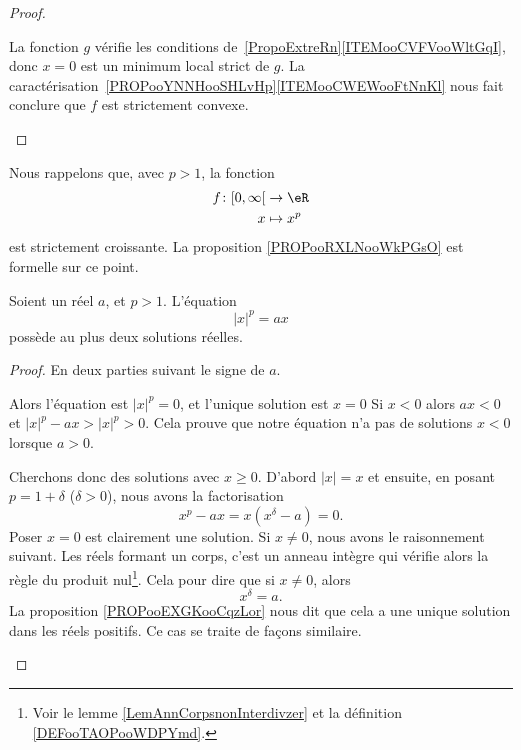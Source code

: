 \begin{proof}
\begin{subproof}
		\spitem[\ref{ITEMooDGISooPlRLOd}]

		La fonction \( g\) vérifie les conditions de~\ref{PropoExtreRn}\ref{ITEMooCVFVooWltGqI}, donc \( x=0\) est un minimum local strict de \( g\). La caractérisation~\ref{PROPooYNNHooSHLvHp}\ref{ITEMooCWEWooFtNnKl} nous fait conclure que \( f\) est strictement convexe.

	\end{subproof}
\end{proof}

\begin{normaltext}
	Nous rappelons que, avec \( p>1\), la fonction
	\begin{equation}
		\begin{aligned}
			f\colon \mathopen[ 0 , \infty \mathclose[ & \to \eR     \\
			x                                         & \mapsto x^p
		\end{aligned}
	\end{equation}
	est strictement croissante. La proposition \ref{PROPooRXLNooWkPGsO} est formelle sur ce point.
\end{normaltext}

\begin{lemma}
	Soient un réel \( a\), et \( p>1\). L'équation
	\begin{equation}
		| x |^p=ax
	\end{equation}
	possède au plus deux solutions réelles.
\end{lemma}

\begin{proof}
	En deux parties suivant le signe de \( a\).
	\begin{subproof}
		\spitem[Si \( a=0\)]
		Alors l'équation est \( | x |^p=0\), et l'unique solution est \( x=0\)
		\spitem[Si \( a>0\)]
		Si \( x<0\) alors \( ax<0\) et \( | x |^p-ax>| x |^p>0\). Cela prouve que notre équation n'a pas de solutions \( x<0\) lorsque \( a>0\).

		Cherchons donc des solutions avec \( x\geq 0\). D'abord \( | x |=x\) et ensuite, en posant \( p=1+\delta\) (\( \delta>0\)), nous avons la factorisation
		\begin{equation}
			x^p-ax=x(x^{\delta}-a)=0.
		\end{equation}
		Poser \( x=0\) est clairement une solution. Si \( x\neq 0\), nous avons le raisonnement suivant. Les réels formant un corps, c'est un anneau intègre qui vérifie alors la règle du produit nul\footnote{Voir le lemme \ref{LemAnnCorpsnonInterdivzer} et la définition \ref{DEFooTAOPooWDPYmd}.}. Cela pour dire que si \( x\neq 0\), alors
		\begin{equation}
			x^{\delta}=a.
		\end{equation}
		La proposition \ref{PROPooEXGKooCqzLor} nous dit que cela a une unique solution dans les réels positifs.
		\spitem[Si \( a<0\)] Ce cas se traite de façons similaire.
	\end{subproof}
\end{proof}

